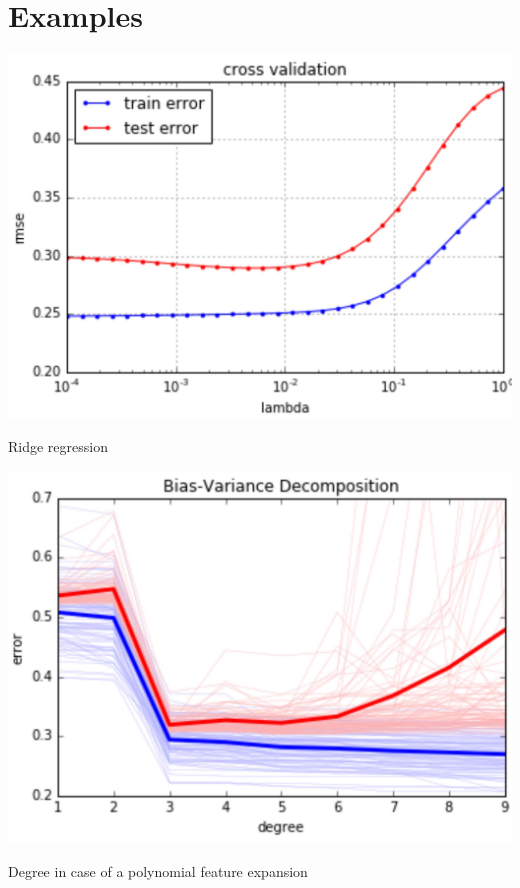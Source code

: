 \documentclass[10pt]{article}
\begin{document}
\section*{Examples}
\begin{center}
\includegraphics[max width=\textwidth]{2023_12_30_b4c98a1755bce7fa9493g-17}
\end{center}

Ridge regression

\begin{center}
\includegraphics[max width=\textwidth]{2023_12_30_b4c98a1755bce7fa9493g-17(1)}
\end{center}

Degree in case of a polynomial feature expansion
\end{document}
